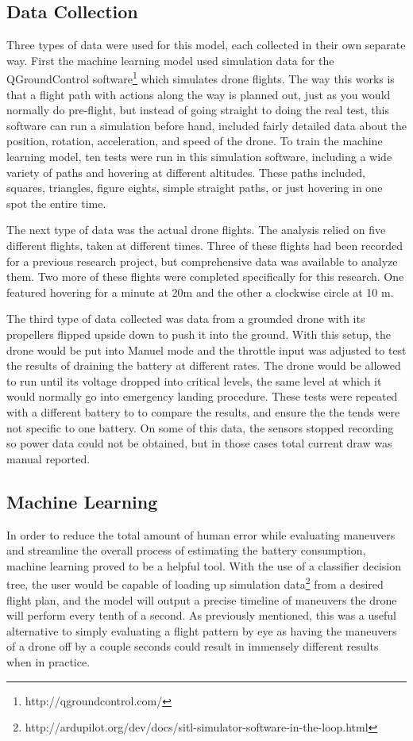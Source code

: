 \documentclass{article}
\begin{document}
\subsection{Data Collection}
Three types of data were used for this model, each collected in their own separate way. First the machine learning model used simulation data for the QGroundControl software\footnote{http://qgroundcontrol.com/} which simulates drone flights. The way this works is that a flight path with actions along the way is planned out, just as you would normally do pre-flight, but instead of going straight to doing the real test, this software can run a simulation before hand, included fairly detailed data about the position, rotation, acceleration, and speed of the drone. To train the machine learning model, ten tests were run in this simulation software, including a wide variety of paths and hovering at different altitudes. These paths included, squares, triangles, figure eights, simple straight paths, or just hovering in one spot the entire time. \par

The next type of data was the actual drone flights. The analysis relied on five different flights, taken at different times. Three of these flights had been recorded for a previous research project, but comprehensive data was available to analyze them. Two more of these flights were completed specifically for this research. One featured hovering for a minute at 20m and the other a clockwise circle at 10 m.\par

The third type of data collected was data from a grounded drone with its propellers flipped upside  down to push it into the ground. With this setup, the drone would be put into Manuel mode and the throttle input was adjusted to test the results of draining the battery at different rates. The drone would be allowed to run until its voltage dropped into critical levels, the same level at which it would normally go into emergency landing procedure. These tests were repeated with a different battery to to compare the results, and ensure the the tends were not specific to one battery. On some of this data, the sensors stopped recording so power data could not be obtained, but in those cases total current draw was manual reported.


\subsection{Machine Learning}
In order to reduce the total amount of human error while evaluating maneuvers and streamline the overall process of estimating the battery consumption, machine learning proved to be a helpful tool. With the use of a classifier decision tree, the user would be capable of loading up simulation data\footnote{http://ardupilot.org/dev/docs/sitl-simulator-software-in-the-loop.html} from a desired flight plan, and the model will output a precise timeline of maneuvers the drone will perform every tenth of a second. As previously mentioned, this was a useful alternative to simply evaluating a flight pattern by eye as having the maneuvers of a drone off by a couple seconds could result in immensely different results when in practice. 
\end{document}
